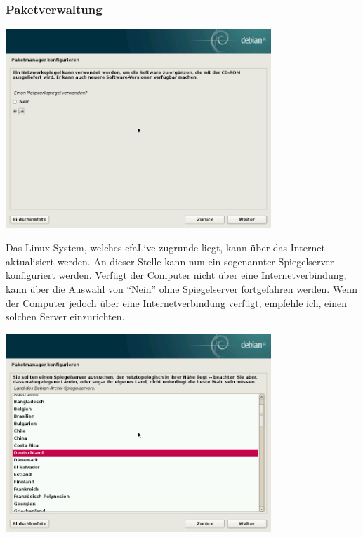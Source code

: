 \documentclass[a4paper,12pt,twoside]{article}
\begin{document}
\subsubsection{Paketverwaltung}
\label{sct:paketverwaltung}

\begin{minipage}{\linewidth}
    \centering
    \includegraphics[width=10cm]{screenshots/use_mirror.png}
    \label{fig:abfrage_mirror}
\end{minipage}
\bigskip

Das Linux System, welches efaLive zugrunde liegt, kann über das Internet
aktualisiert werden. An dieser Stelle kann nun ein sogenannter
Spiegelserver konfiguriert werden. Verfügt der Computer nicht über eine
Internetverbindung, kann über die Auswahl von
"`Nein"' ohne Spiegelserver fortgefahren
werden. Wenn der Computer jedoch über eine Internetverbindung verfügt,
empfehle ich, einen solchen Server einzurichten.

\begin{minipage}{\linewidth}
    \centering
    \includegraphics[width=10cm]{screenshots/select_mirror_country.png}
    \label{fig:mirror_region}
\end{minipage}
\end{document}
